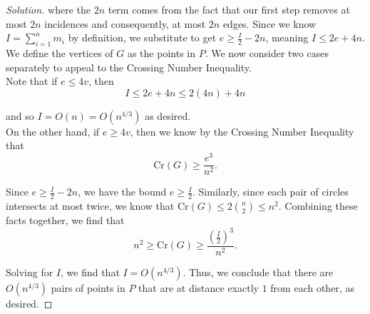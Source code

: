\documentclass[11pt]{article}
\newenvironment{solution}
  {\renewcommand\qedsymbol{$\blacksquare$}\begin{proof}[Solution]}
  {\end{proof}}
\begin{document}
\begin{enumerate}
\begin{solution}
    where the $2n$ term comes from the fact that our first step removes at most $2n$ incidences and consequently, at most $2n$ edges. Since we know $I = \sum\limits_{i=1}^{n} m_i$ by definition, we substitute to get $e \geq \frac{I}{2} - 2n$, meaning $I \leq 2e + 4n.$ \\

    We define the vertices of $G$ as the points in $P$. We now consider two cases separately to appeal to the Crossing Number Inequality. \\

    Note that if $e \leq 4v$, then 
    \[ I \leq 2e + 4n \leq 2(4n) + 4n\]

    and so $I = O(n) = O(n^{4/3})$ as desired. \\
    
    On the other hand, if $e \geq 4v$, then we know by the Crossing Number Inequality that
    \[ \mathrm{Cr}(G) \geq \frac{e^3}{n^2}.\]

    Since $e \geq \frac{I}{2} - 2n$, we have the bound $e \geq \frac{I}{2}$. Similarly, since each pair of circles intersects at most twice, we know that $\mathrm{Cr}(G) \leq 2\binom{n}{2} \leq n^2.$ Combining these facts together, we find that
    \[ n^2 \geq \mathrm{Cr}(G) \geq \frac{\left(\frac{I}{2}\right)^3}{n^2}.\]

    Solving for $I$, we find that $I = O(n^{4/3})$. Thus, we conclude that there are $O(n^{4/3})$ pairs of points in $P$ that are at distance exactly $1$ from each other, as desired. \end{solution}

\end{enumerate}
\end{document}
